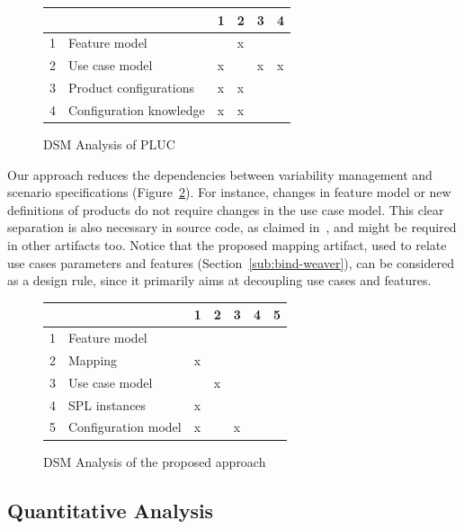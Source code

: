 \documentclass[11pt]{report}
\begin{document}
\begin{figure}[htb]
\centering
\begin{small}
\begin{tabular}{llllll} \hline
&  & 1 & 2 & 3 & 4 \\ \hline
1 & Feature model 			& 	& x	& 	&   	\\ 
2 & Use case model 		& x 	&  	&  x	&  x  \\ 
3 & Product configurations	& x 	& x	& 	&    	\\
4 & Configuration knowledge 	& x 	& x 	& 	&    	\\ \hline
\end{tabular}
\end{small}
 \caption{DSM Analysis of PLUC}
\label{dsm:pluc}
\end{figure}

Our approach reduces the dependencies between variability management and scenario specifications 
(Figure~\ref{dsm:cc}). For instance, changes in feature model or new definitions of products do not require changes in the use case model. This clear separation is also necessary in source code, as claimed in~\cite{alves-gpce-06, apel-icse2006}, and might be required in other artifacts too. Notice that the proposed mapping artifact, used to relate use cases parameters and features (Section~\ref{sub:bind-weaver}), can be considered as a design rule, since it primarily aims at decoupling use cases and features.  

\begin{figure}[h]
\centering
\begin{small}
\begin{tabular}{lllllll} \hline
& & 1 & 2 & 3 & 4 & 5 \\ \hline
1 & Feature model 		& 	& 	&      &  	&  	\\ 
2 & Mapping	 		& x	&	&	&	&  	\\
3 & Use case model 	&  	&  x	&  	&  	& 	\\
4 & SPL instances 		& x 	& 	& 	&   	& 	\\
5 & Configuration model 	& x 	&  	&  x	&  	& 	\\  \hline
\end{tabular}
\end{small}
 \caption{DSM Analysis of the proposed approach}
\label{dsm:cc}
\end{figure}   

\subsection{Quantitative Analysis}
\end{document}
